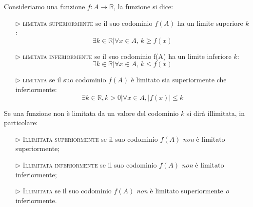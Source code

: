 \begin{definizione}
Consideriamo una funzione \(f: A\to \mathbb{R}\), la funzione si dice:
  \begin{itemize}
  \item[\(\rhd\)]\textsc{limitata superiormente} se il suo 
codominio \(f(A)\) ha un limite superiore \(k\):
\[\exists k\in \mathbb{R} \vert \forall x\in A,\, k\geq f(x)\] 
  \item[\(\rhd\)]\textsc{limitata inferiormente} se il suo 
codominio f(A) ha un limite inferiore \(k\): 
\[\exists k\in \mathbb{R} \vert \forall x\in A,\, k\leq f(x)\]

  \item[\(\rhd\)]\textsc{limitata} se il suo codominio \(f(A)\) è 
limitato sia superiormente che inferiormente:
\[\exists k\in \mathbb{R},k>0\vert\forall x\in A, \vert f(x)\vert \leq k\]
\end{itemize}

Se una funzione non è limitata da un valore del codominio \(k\) si dirà 
illimitata, in particolare:
  \begin{itemize} 
  \item[\(\rhd\)] \textsc{Illimitata superiormente} se il suo 
codominio \(f(A)\) \emph{non} è limitato superiormente;
  \item[\(\rhd\)] \textsc{Illimitata inferiormente} se il suo 
codominio \(f(A)\) \emph{non} è limitato inferiormente;
  \item[\(\rhd\)] \textsc{Illimitata} se il suo codominio \(f(A)\) 
\emph{non} è limitato superiormente \emph{o} inferiormente.
  \end{itemize}
\end{definizione}
%
